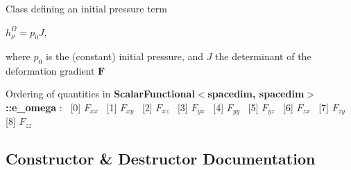 Class defining an initial pressure term

$h^\Omega_\rho = p_0 J$,

where $p_0$ is the (constant) initial pressure, and $J$ the determinant of the deformation gradient $\boldsymbol{F}$

Ordering of quantities in {\bf Scalar\+Functional$<$spacedim, spacedim$>$\+::e\+\_\+omega} \+:~\newline
 \mbox{[}0\mbox{]} $F_{xx}$~\newline
 \mbox{[}1\mbox{]} $F_{xy}$~\newline
 \mbox{[}2\mbox{]} $F_{xz}$~\newline
 \mbox{[}3\mbox{]} $F_{yx}$~\newline
 \mbox{[}4\mbox{]} $F_{yy}$~\newline
 \mbox{[}5\mbox{]} $F_{yz}$~\newline
 \mbox{[}6\mbox{]} $F_{zx}$~\newline
 \mbox{[}7\mbox{]} $F_{zy}$~\newline
 \mbox{[}8\mbox{]} $F_{zz}$~\newline
 

\subsection{Constructor \& Destructor Documentation}
